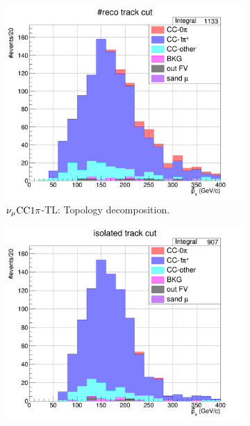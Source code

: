           \begin{figure}
               \centering
               \begin{subfigure}{\dbfigwid\textwidth}
                    \includegraphics[width=\textwidth]{figures/sel/finhist_pi_mom_topology_TL.png}
                    \caption{$\nu_{\mu}\textrm{CC}1\pi$-TL: Topology decomposition.}
                    \label{subfig:stack-topo-tl}
               \end{subfigure}
               \begin{subfigure}{\dbfigwid\textwidth}
                    \includegraphics[width=\textwidth]{figures/sel/finhist_pi_mom_topology_TR.png}

\end{subfigure}
\end{figure}
